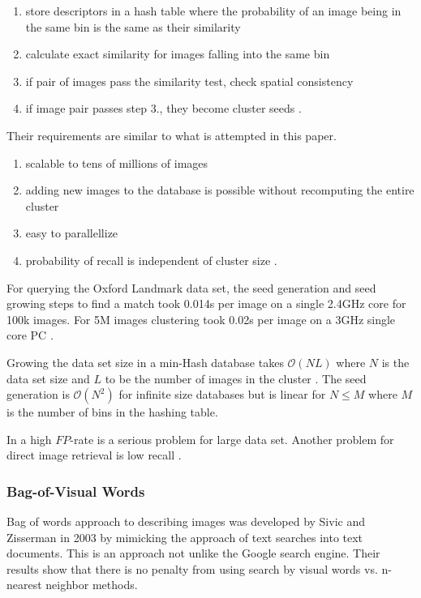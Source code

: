 \documentclass[english,12pt,a4paper,pdftex,elec,utf8]{aaltothesis}
\begin{document}
\begin{enumerate}
\item store descriptors in a hash table where the probability of an image being in the same bin is the same as their similarity
\item calculate exact similarity for images falling into the same bin
\item if pair of images pass the similarity test, check spatial consistency
\item if image pair passes step 3., they become cluster seeds \cite{Chum2010}.
\end{enumerate}

Their requirements are similar to what is attempted in this paper.

\begin{enumerate}
\item scalable to tens of millions of images
\item adding new images to the database is possible without recomputing the entire cluster
\item easy to parallellize
\item probability of recall is independent of cluster size \cite{Chum2010}.
\end{enumerate}

For querying the Oxford Landmark data set, the seed generation and seed growing steps to find a match took 0.014s per image on a single 2.4GHz core for 100k images. For 5M images clustering took 0.02s per image on a 3GHz single core PC \cite{Chum2010}.

Growing the data set size in a min-Hash database takes $\mathcal{O}(NL)$ where $N$ is the data set size and $L$ to be the number of images in the cluster \cite{Chum2010}. The seed generation is $\mathcal{O}(N^2)$ for infinite size databases but is linear for $N \leq M$ where $M$ is the number of bins in the hashing table.

In \cite{Lee2010} a high $FP$-rate is a serious problem for large data set. Another problem for direct image retrieval is low recall \cite{Chum2010}.

\subsubsection{Bag-of-Visual Words}\label{BOW}
Bag of words approach to describing images was developed by Sivic and Zisserman in 2003 by mimicking the approach of text searches into text documents. This is an approach not unlike the Google search engine. Their results show that there is no penalty from using search by visual words vs. n-nearest neighbor methods.\cite{Sivic2003}
\end{document}
